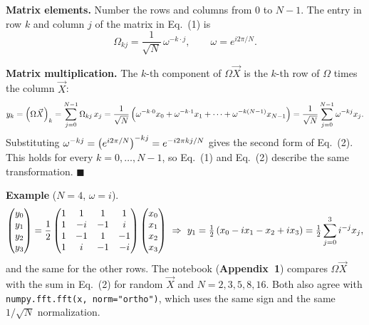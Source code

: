 \documentclass[a4paper, 10pt]{article}
\begin{document}
\begin{solution}
	\noindent \textbf{Matrix elements.} Number the rows and columns from \( 0 \) to \( N - 1 \). The entry in row \( k \) and column \( j \) of the matrix in Eq.~(1) is
	\[
		\Omega_{kj} = \frac{1}{\sqrt{N}}\,\omega^{-k \cdot j}, \qquad \omega = e^{i2\pi/N}.
	\]

	\myspace

	\noindent \textbf{Matrix multiplication.} The \( k \)-th component of \( \Omega\vec{X} \) is the \( k \)-th row of \( \Omega \) times the column \( \vec{X} \):
	\[
		y_k = \left(\Omega\vec{X}\right)_k = \sum_{j = 0}^{N - 1}\Omega_{kj}\,x_j
		= \frac{1}{\sqrt{N}}\left(\omega^{-k \cdot 0}x_0 + \omega^{-k \cdot 1}x_1 + \cdots + \omega^{-k(N - 1)}x_{N - 1}\right)
		= \frac{1}{\sqrt{N}}\sum_{j = 0}^{N - 1}\omega^{-kj}x_j .
	\]
	Substituting \( \omega^{-kj} = \left(e^{i2\pi/N}\right)^{-kj} = e^{-i2\pi kj/N} \) gives the second form of Eq.~(2). This holds for every \( k = 0, \dots, N - 1 \), so Eq.~(1) and Eq.~(2) describe the same transformation. \( \blacksquare \)

	\myspace

	\noindent \textbf{Example} (\( N = 4 \), \( \omega = i \)).
	\[
		\begin{pmatrix} y_0 \\ y_1 \\ y_2 \\ y_3 \end{pmatrix}
		= \frac{1}{2}\begin{pmatrix}
			1 & 1  & 1  & 1  \\
			1 & -i & -1 & i  \\
			1 & -1 & 1  & -1 \\
			1 & i  & -1 & -i
		\end{pmatrix}\begin{pmatrix} x_0 \\ x_1 \\ x_2 \\ x_3 \end{pmatrix}
		\ \Rightarrow\
		y_1 = \tfrac{1}{2}\left(x_0 - ix_1 - x_2 + ix_3\right) = \tfrac{1}{2}\sum_{j = 0}^{3} i^{-j}x_j ,
	\]
	and the same for the other rows.
	The notebook (\textbf{Appendix~1}) compares \( \Omega\vec{X} \) with the sum in Eq.~(2) for random \( \vec{X} \) and \( N = 2, 3, 5, 8, 16 \).
	Both also agree with \texttt{numpy.fft.fft(x, norm="ortho")}, which uses the same sign and the same \( 1/\sqrt{N} \) normalization.
\end{solution}
\end{document}
